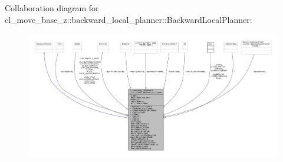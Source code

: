 Collaboration diagram for cl\+\_\+move\+\_\+base\+\_\+z\+:\+:backward\+\_\+local\+\_\+planner\+:\+:Backward\+Local\+Planner\+:
\nopagebreak
\begin{figure}[H]
\begin{center}
\leavevmode
\includegraphics[width=350pt]{classcl__move__base__z_1_1backward__local__planner_1_1BackwardLocalPlanner__coll__graph}
\end{center}
\end{figure}
